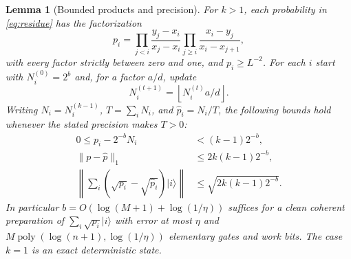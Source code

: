 \documentclass[11pt]{article}
\newtheorem{lemma}[theorem]{Lemma}
\theoremstyle{definition}
\newcommand{\ket}[1]{\lvert #1\rangle}
\newcommand{\norm}[1]{\lVert #1\rVert}
\newcommand{\poly}{\operatorname{poly}}
\begin{document}
\begin{lemma}[Bounded products and precision]\label{lem:precision}
For $k>1$, each probability in \eqref{eq:residue} has the factorization
\begin{equation}\label{eq:bounded}
 p_i=\prod_{j<i}\frac{y_j-x_i}{x_j-x_i}
       \prod_{j\ge i}\frac{x_i-y_j}{x_i-x_{j+1}},
\end{equation}
with every factor strictly between zero and one, and $p_i\ge L^{-2}$.
For each $i$ start with $N_i^{(0)}=2^b$ and, for a factor $a/d$, update
\[
 N_i^{(t+1)}=\left\lfloor N_i^{(t)}a/d\right\rfloor.
\]
Writing $N_i=N_i^{(k-1)}$, $T=\sum_iN_i$, and $\widehat p_i=N_i/T$,
the following bounds hold whenever the stated precision makes $T>0$:
\begin{align}
 0\le p_i-2^{-b}N_i&<(k-1)2^{-b},\label{eq:round}\\
 \norm{p-\widehat p}_1&\le2k(k-1)2^{-b},\label{eq:l1}\\
 \left\|\sum_i(\sqrt{p_i}-\sqrt{\widehat p_i})\ket i\right\|
 &\le\sqrt{2k(k-1)2^{-b}}.\label{eq:root}
\end{align}
In particular $b=O(\log(M+1)+\log(1/\eta))$ suffices for a clean
coherent preparation of $\sum_i\sqrt{p_i}\ket i$ with error at most $\eta$
and $M\poly(\log(n+1),\log(1/\eta))$ elementary gates and work bits.
The case $k=1$ is an exact deterministic state.
\end{lemma}
\end{document}
